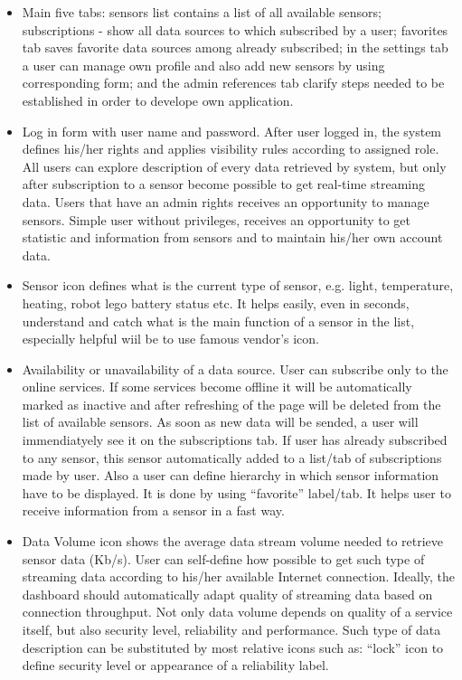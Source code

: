       \begin{itemize}
      \item Main five tabs: sensors list contains a list of all available sensors; subscriptions - show all data sources to which subscribed by a user; favorites tab saves favorite data sources among already subscribed; in the settings tab a user can manage own profile and also add new sensors by using corresponding form; and the admin references tab clarify steps needed to be established in order to develope own application.
      \item Log in form with user name and password. After user logged in, the system defines his/her rights and applies visibility rules according to assigned role. All users can explore description of every data retrieved by system, but only after subscription to a sensor become possible to get real-time streaming data. Users that have an admin rights receives an opportunity to manage sensors. Simple user without privileges, receives an opportunity to get statistic and information from sensors and to maintain his/her own account data.
      \item Sensor icon defines what is the current type of sensor, e.g. light, temperature, heating, robot lego battery status etc. It helps easily, even in seconds, understand and catch what is the main function of a sensor in the list, especially helpful wiil be to use famous vendor's icon.
      \item Availability or unavailability of a data source. User can subscribe only to the online services. If some services become offline it will be automatically marked as inactive and after refreshing of the page will be deleted from the list of available sensors. As soon as new data will be sended, a user will immendiatyely see it on the subscriptions tab. If user has already subscribed to any sensor, this sensor automatically added to a list/tab of subscriptions made by user. Also a user can define hierarchy in which sensor information have to be displayed. It is done by using ``favorite'' label/tab. It helps user to receive information from a sensor in a fast way.
      \item Data Volume icon shows the average data stream volume needed to retrieve sensor data (Kb/s). User can self-define how possible to get such type of streaming data according to his/her available Internet connection. Ideally, the dashboard should automatically adapt quality of streaming data based on connection throughput. Not only data volume depends on quality of a service itself, but also security level, reliability and performance. Such type of data description can be substituted by most relative icons such as: ``lock'' icon to define security level or appearance of a reliability label.

\end{itemize}
